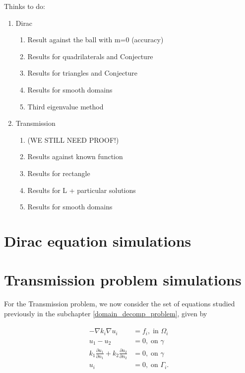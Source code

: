 \label{chap:implement}

Thinks to do:
\begin{enumerate}
    \item Dirac
    \begin{enumerate}
        \item Result against the ball with m=0 (accuracy)
        \item Results for quadrilaterals and Conjecture
        \item Results for triangles and Conjecture
        \item Results for smooth domains
        \item Third eigenvalue method
    \end{enumerate}
    \item Transmission
    \begin{enumerate}
        \item (WE STILL NEED PROOF!)
        \item Results against known function
        \item Results for rectangle
        \item Results for L + particular solutions
        \item Results for smooth domains
    \end{enumerate}
\end{enumerate}

\section{Dirac equation simulations}


\section{Transmission problem simulations}

For the Transmission problem, we now consider the set of equations studied previously in the subchapter \ref{domain_decomp_problem}, given by

\begin{align}\label{transmission_num}
    \begin{split}
    - \nabla k_i \nabla u_i &= f_i, \; \text{in }\Omega_i\\
    u_1 - u_2 &= 0, \; \text{on }\gamma\\
    k_1 \frac{\partial u_1}{\partial n_1} + k_2 \frac{\partial u_2}{\partial n_2} &= 0, \; \text{on }\gamma\\
    u_i &= 0, \; \text{on }\Gamma_i.
    \end{split}
\end{align}

